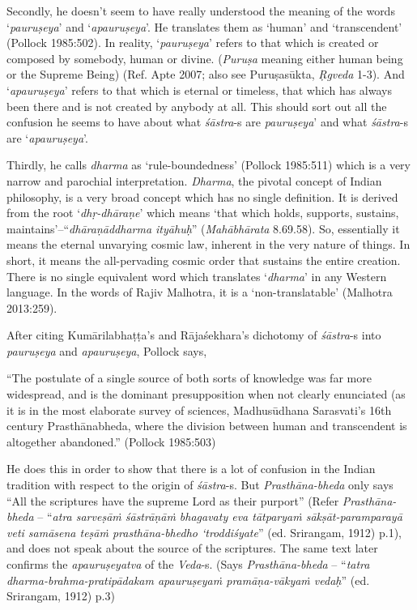 Secondly, he doesn't seem to have really understood the meaning of the words `{\sl pauruṣeya}' and `{\sl apauruṣeya}'. He translates them as `human' and `transcendent' (Pollock 1985:502). In reality, `{\sl pauruṣeya}' refers to that which is created or composed by somebody, human or divine. ({\sl Puruṣa} meaning either human being or the Supreme Being) (Ref. Apte 2007; also see Puruṣasūkta, {\sl Ṛgveda} 1-3). And `{\sl apauruṣeya}' refers to that which is eternal or timeless, that which has always been there and is not created by anybody at all. This should sort out all the confusion he seems to have about what {\sl śāstra}-s are {\sl pauruṣeya}' and what {\sl śāstra}-s are `{\sl apauruṣeya}'. 

Thirdly, he calls {\sl dharma} as `rule-boundedness' (Pollock 1985:511) which is a very narrow and parochial interpretation. {\sl Dharma}, the pivotal concept of Indian philosophy, is a very broad concept which has no single definition. It is derived from the root `{\sl dhṛ-dhāraṇe}' which means `that which holds, supports, sustains, maintains'--``{\sl dhāraṇāddharma ityāhuḥ}'' ({\sl Mahābhārata} 8.69.58). So, essentially it means the eternal unvarying cosmic law, inherent in the very nature of things. In short, it means the all-pervading cosmic order that sustains the entire creation. There is no single equivalent word which translates `{\sl dharma}' in any Western language. In the words of Rajiv Malhotra, it is a `non-translatable' (Malhotra 2013:259).

After citing Kumārilabhaṭṭa's and Rājaśekhara's dichotomy of {\sl śāstra}-s into {\sl pauruṣeya} and {\sl apauruṣeya}, Pollock says,
\begin{myquote}
``The postulate of a single source of both sorts of knowledge was far more widespread, and is the dominant presupposition when not clearly enunciated (as it is in the most elaborate survey of sciences, Madhusūdhana Sarasvati's 16th century Prasthānabheda, where the division between human and transcendent is altogether abandoned.'' (Pollock 1985:503)
\end{myquote}

He does this in order to show that there is a lot of confusion in the Indian tradition with respect to the origin of {\sl śāstra}-s. But {\sl Prasthāna-bheda} only says ``All the scriptures have the supreme Lord as their purport'' (Refer {\sl Prasthāna-bheda} -- ``{\sl atra sarveṣāṁ śāstrāṇāṁ bhagavaty eva tātparyaṁ sākṣāt-paramparayā veti samāsena teṣāṁ prasthāna-bhedho `troddiśyate}'' (ed. Srirangam, 1912) p.1), and does not speak about the source of the scriptures. The same text later confirms the {\sl apauruṣeyatva} of the {\sl Veda}-s. (Says {\sl Prasthāna-bheda} -- ``{\sl tatra dharma-brahma-pratipādakam apauruṣeyaṁ pramāṇa-vākyaṁ vedaḥ}'' (ed. Srirangam, 1912) p.3)

